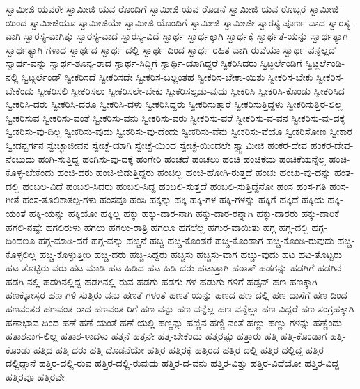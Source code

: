 {ಸ್ವಾಮೀಜಿ-ಯವರೇ
ಸ್ವಾಮೀಜಿ-ಯವ-ರೊಂದಿಗೆ
ಸ್ವಾಮೀಜಿ-ಯವ-ರೊಡನೆ
ಸ್ವಾಮೀಜಿ-ಯವ-ರೊಬ್ಬರೆ
ಸ್ವಾಮೀಜಿ-ಯಿಂದ
ಸ್ವಾಮೀಜಿಯೂ
ಸ್ವಾಮೀಜಿಯೇ
ಸ್ವಾಮೀಜಿ-ಯೊಂದಿಗೆ
ಸ್ವಾಮೀಜಿ
ಸ್ವಾಮೀಜೀ
ಸ್ವಾರಸ್ಯ-ಪೂರ್ಣ-ವಾದ
ಸ್ವಾರಸ್ಯ-ವಾಗಿ
ಸ್ವಾರಸ್ಯ-ವಾಗಿತ್ತು
ಸ್ವಾರಸ್ಯ-ವಾದ
ಸ್ವಾರಸ್ಯ-ವಿದೆ
ಸ್ವಾರ್ಥ
ಸ್ವಾರ್ಥಕ್ಕಾಗಿ
ಸ್ವಾರ್ಥಕ್ಕೆ
ಸ್ವಾರ್ಥತೆ-ಯನ್ನು
ಸ್ವಾರ್ಥತ್ಯಾಗ
ಸ್ವಾರ್ಥತ್ಯಾಗಿ-ಗಳಾದ
ಸ್ವಾರ್ಥದ
ಸ್ವಾರ್ಥ-ದಲ್ಲಿ
ಸ್ವಾರ್ಥ-ದಿಂದ
ಸ್ವಾರ್ಥ-ರಹಿತ-ವಾಗಿ-ರುವೆಯಾ
ಸ್ವಾರ್ಥ-ವನ್ನಲ್ಲದೆ
ಸ್ವಾರ್ಥ-ವನ್ನು
ಸ್ವಾರ್ಥ-ಶೂನ್ಯ-ರಾದ
ಸ್ವಾರ್ಥ-ಸಿದ್ಧಿಗೆ
ಸ್ವಾರ್ಥಿ-ಯಾಗಿದ್ದರೆ
ಸ್ವಿಕರಿಸಿದರು
ಸ್ವಿಟ್ಜರ್ಲೆಂಡಿಗೆ
ಸ್ವಿಟ್ಜರ್ಲೆಂಡಿ-ನಲ್ಲಿ
ಸ್ವಿಟ್ಸರ್ಲೆಂಡ್
ಸ್ವೀಕರಿಸದೆ
ಸ್ವೀಕರಿಸದೇ
ಸ್ವೀಕರಿಸ-ಬಲ್ಲಂತಹ
ಸ್ವೀಕರಿಸ-ಬೇಕಾ-ಯಿತು
ಸ್ವೀಕರಿಸ-ಬೇಕು
ಸ್ವೀಕರಿಸ-ಬೇಕೆಂದು
ಸ್ವೀಕರಿಸಲಿ
ಸ್ವೀಕರಿಸಲು
ಸ್ವೀಕರಿಸಲೇ-ಬೇಕು
ಸ್ವೀಕರಿಸಲ್ಪಡು-ವುದು
ಸ್ವೀಕರಿಸಿ
ಸ್ವೀಕರಿಸಿ-ಕೊಂಡು
ಸ್ವೀಕರಿಸಿದ
ಸ್ವೀಕರಿಸಿ-ದರು
ಸ್ವೀಕರಿಸಿ-ದರೂ
ಸ್ವೀಕರಿಸಿ-ದಳು
ಸ್ವೀಕರಿಸಿದ್ದರು
ಸ್ವೀಕರಿಸುತ್ತಾರೆ
ಸ್ವೀಕರಿಸುತ್ತಿದ್ದಳು
ಸ್ವೀಕರಿಸುತ್ತಿರ-ಲಿಲ್ಲ
ಸ್ವೀಕರಿಸುವ
ಸ್ವೀಕರಿಸು-ವಂತೆ
ಸ್ವೀಕರಿಸು-ವನು
ಸ್ವೀಕರಿಸು-ವರು
ಸ್ವೀಕರಿಸು-ವರೆ
ಸ್ವೀಕರಿಸು-ವ-ವನ
ಸ್ವೀಕರಿಸು-ವು-ದಕ್ಕೆ
ಸ್ವೀಕರಿಸು-ವು-ದಿಲ್ಲ
ಸ್ವೀಕರಿಸು-ವುದು
ಸ್ವೀಕರಿಸು-ವು-ದೆಂದು
ಸ್ವೀಕರಿಸು-ವೆನು
ಸ್ವೀಕರಿಸು-ವೆಯೊ
ಸ್ವೀಕರಿಸೋಣ
ಸ್ವೀಕಾರ
ಸ್ವೀಡನ್ಬರ್ಗನ
ಸ್ವೇಚ್ಛಾಜೀವನ
ಸ್ವೇಚ್ಛೆ-ಯಾಗಿ
ಸ್ವೇಚ್ಛೆ-ಯಿಂದ
ಸ್ವೇಚ್ಛೆ-ಯಿಂದಲೇ
ಸ್ವ್ವಾಮೀಜಿ
ಹಂಕರ-ದೇವ
ಹಂಕರ-ದೇವ-ನೆಂಬುದು
ಹಂಗಿ-ಸುತ್ತಿದ್ದ
ಹಂಗಿಸು-ವು-ದಕ್ಕೆ
ಹಂಗೇರಿ
ಹಂಚದೆ
ಹಂಚಲು
ಹಂಚಿ
ಹಂಚಿಕೆಯ
ಹಂಚಿಕೆಯನ್ನೆಲ್ಲ
ಹಂಚಿ-ಕೊಳ್ಳ-ಬೇಕೆಂದು
ಹಂಚಿ-ದರು
ಹಂಚಿ-ಬಿಡುತ್ತಿದ್ದರು
ಹಂಚಿಲ್ಲ
ಹಂಚಿ-ಹೋಗಿ-ರುತ್ತದೆ
ಹಂಚು
ಹಂಚು-ವು-ದನ್ನು
ಹಂತ-ದಲ್ಲಿ
ಹಂಬಲ-ವಿದೆ
ಹಂಬಲಿ-ಸಿದರು
ಹಂಬಲಿ-ಸಿದ್ದ
ಹಂಬಲಿ-ಸುತ್ತದೆ
ಹಂಬಲಿ-ಸುತ್ತಿದ್ದೆನೋ
ಹಂಸ
ಹಂಸ-ಗತಿ
ಹಂಸ-ಗೀತೆ
ಹಂಸ-ತೂಲಿಕಾತಲ್ಪ-ಗಳು
ಹಂಸವೂ
ಹಂಸಿ
ಹಕ್ಕನ್ನು
ಹಕ್ಕಿ
ಹಕ್ಕಿ-ಗಳ
ಹಕ್ಕಿ-ಗಳನ್ನು
ಹಕ್ಕಿಗೆ
ಹಕ್ಕಿದೆ
ಹಕ್ಕಿಯ
ಹಕ್ಕಿ-ಯಂತೆ
ಹಕ್ಕಿ-ಯನ್ನು
ಹಕ್ಕಿಯೋ
ಹಕ್ಕಿಲ್ಲ
ಹಕ್ಕು
ಹಕ್ಕು-ದಾರ-ನಾಗಿ
ಹಕ್ಕು-ದಾರ-ರನ್ನಾಗಿ
ಹಕ್ಕು-ದಾರರು
ಹಕ್ಕು-ದಾರಿಕೆ
ಹಗಲಿ-ನಷ್ಟೇ
ಹಗಲಿರುಳು
ಹಗಲು
ಹಗಲು-ರಾತ್ರಿ
ಹಗಲೂ
ಹಗಲೆಲ್ಲ
ಹಗುರ-ವಾಯಿತು
ಹಗ್ಗ
ಹಗ್ಗ-ದಲ್ಲಿ
ಹಗ್ಗ-ದಿಂದಲೂ
ಹಗ್ಗ-ಮಾಡಿ-ದರೆ
ಹಗ್ಗ-ವನ್ನು
ಹಚ್ಚನೆ
ಹಚ್ಚಿ
ಹಚ್ಚಿ-ಕೊಂಡರೆ
ಹಚ್ಚಿ-ಕೊಂಡಾಗ
ಹಚ್ಚಿ-ಕೊಂಡಿ-ರುವುದು
ಹಚ್ಚಿ-ಕೊಳ್ಳಲಿಲ್ಲ
ಹಚ್ಚಿ-ಕೊಳ್ಳುತ್ತೀರಿ
ಹಚ್ಚಿ-ದರು
ಹಚ್ಚಿ-ಸಿದ್ದರು
ಹಚ್ಚಿಸು
ಹಚ್ಚಿಸು-ವಾಗ
ಹಚ್ಚು-ವುದು
ಹಟ
ಹಟ-ತೊಟ್ಟರು
ಹಟ-ತೊಟ್ಟಿರು-ವರು
ಹಟ-ಮಾಡಿ
ಹಟ-ಹಿಡಿದ
ಹಟ-ಹಿಡಿ-ದರು
ಹಟಾತ್ತಾಗಿ
ಹಠಾತ್
ಹಡಗನ್ನು
ಹಡಗಿಗೆ
ಹಡಗಿನ
ಹಡಗಿ-ನಲ್ಲಿ
ಹಡಗಿನಲ್ಲಿದ್ದ
ಹಡಗಿನಲ್ಲಿ-ರುವ
ಹಡಗು
ಹಡಗು-ಗಳ
ಹಡುಗು-ಗಳಿಗೆ
ಹಡ್ಸನ್
ಹಣ
ಹಣಕ್ಕಾಗಿ
ಹಣಕ್ಕೋಸ್ಕರ
ಹಣ-ಗಳಿ-ಸುತ್ತಿರು-ವನು
ಹಣತೆ-ಗಳಂತೆ
ಹಣತೆ-ಯನ್ನು
ಹಣದ
ಹಣ-ದಲ್ಲಿ
ಹಣ-ದಾಸೆಗೆ
ಹಣ-ದಿಂದ
ಹಣವಂತರ
ಹಣವಂತ-ರಾದ
ಹಣವಂತ-ರಿಗೆ
ಹಣ-ವನ್ನು
ಹಣ-ವನ್ನೆಲ್ಲ
ಹಣ-ವನ್ನೆಲ್ಲಾ
ಹಣ-ವಿದ್ದರೆ
ಹಣ-ಸಂಗ್ರಹಕ್ಕಾಗಿ
ಹಣಾಭಾವ-ದಿಂದ
ಹಣೆ
ಹಣೆ-ಯಂತೆ
ಹಣೆ-ಯಲ್ಲಿ
ಹಣ್ಣನ್ನು
ಹಣ್ಣಿನ
ಹಣ್ಣಿ-ನಂತೆ
ಹಣ್ಣು
ಹಣ್ಣು-ಗಳನ್ನು
ಹಣ್ಣೆಂದು
ಹತಾಶನಾಗ-ಲಿಲ್ಲ
ಹತಾಶ-ಳಾದಳು
ಹತ್ತನೆ
ಹತ್ತನೇ
ಹತ್ತ-ಬೇಕೆಂದು
ಹತ್ತರಷ್ಟು
ಹತ್ತಾರು
ಹತ್ತಿ
ಹತ್ತಿ-ಕೊಂಡಾಗ
ಹತ್ತಿ-ಕೊಂಡು
ಹತ್ತಿದ
ಹತ್ತಿ-ದರು
ಹತ್ತಿ-ದೊಡನೆಯೇ
ಹತ್ತಿರ
ಹತ್ತಿರಕ್ಕೆ
ಹತ್ತಿರದ
ಹತ್ತಿರ-ದಲ್ಲಿ
ಹತ್ತಿರ-ದಲ್ಲಿದ್ದ
ಹತ್ತಿರ-ದಲ್ಲಿದ್ದಾನೆ
ಹತ್ತಿರ-ದಲ್ಲಿ-ರುವ
ಹತ್ತಿರ-ದಲ್ಲಿ-ರುವುದು
ಹತ್ತಿರ-ದ-ವನು
ಹತ್ತಿರ-ವಿತ್ತು
ಹತ್ತಿರ-ವಿದೆಯೋ
ಹತ್ತಿರ-ವಿದ್ದ
ಹತ್ತಿರವೂ
ಹತ್ತಿರವೇ
}
